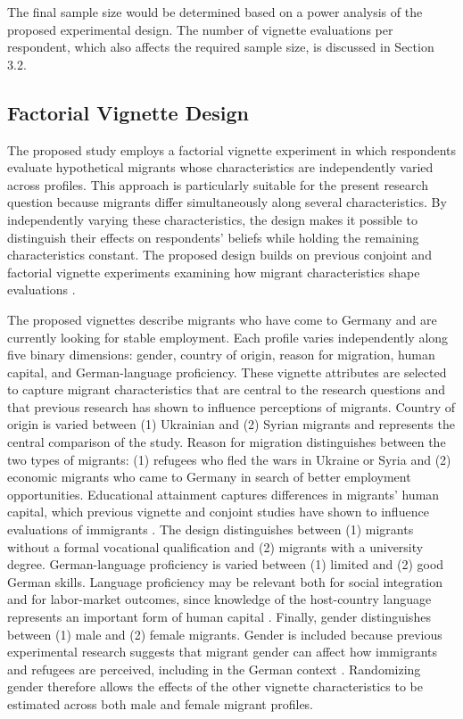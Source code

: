 The final sample size would be determined based on a power analysis of the proposed experimental design. The number 
of vignette evaluations per respondent, which also affects the required sample size, is discussed in Section 3.2.

\subsection{Factorial Vignette Design}

The proposed study employs a factorial vignette experiment in which respondents evaluate hypothetical migrants whose 
characteristics are independently varied across profiles. This approach is particularly suitable for the present 
research question because migrants differ simultaneously along several characteristics. By independently varying these 
characteristics, the design makes it possible to distinguish their effects on respondents’ beliefs while holding the remaining 
characteristics constant. The proposed design builds on previous conjoint and factorial vignette experiments examining 
how migrant characteristics shape evaluations \citep{hainmueller2015hidden, bansak2016economic, czymara2016deutschland}.

The proposed vignettes describe migrants who have come to Germany and are currently looking for stable employment. 
Each profile varies independently along five binary dimensions: gender, country of origin, reason for migration, 
human capital, and German-language proficiency. 
These vignette attributes are selected to capture migrant characteristics that are central to the research questions 
and that previous research has shown to influence perceptions of migrants. Country of origin is varied between 
(1) Ukrainian and (2) Syrian migrants and represents the central comparison of the study. Reason for migration 
distinguishes between the two types of migrants: (1) refugees who fled the wars in Ukraine or Syria and (2) economic 
migrants who came to Germany in search of better employment opportunities. Educational attainment captures 
differences in migrants' human capital, which previous vignette and conjoint studies have shown to influence 
evaluations of immigrants \citep{hainmueller2010attitudes, hainmueller2015hidden, czymara2016deutschland}. 
The design distinguishes between (1) migrants without a formal vocational qualification and (2) migrants with a 
university degree. German-language proficiency is varied between (1) limited and (2) good German skills. 
Language proficiency may be relevant both for social integration and for labor-market outcomes, since knowledge of the 
host-country language represents an important form of human capital \citep{czymara2016deutschland}. 
Finally, gender distinguishes between (1) male and (2) female migrants. Gender is included because previous 
experimental research suggests that migrant gender can affect how immigrants and refugees are perceived, including in 
the German context \citep{czymara2017refugees, gereke2020gendered}. Randomizing gender therefore allows the effects 
of the other vignette characteristics to be estimated across both male and female migrant profiles.

